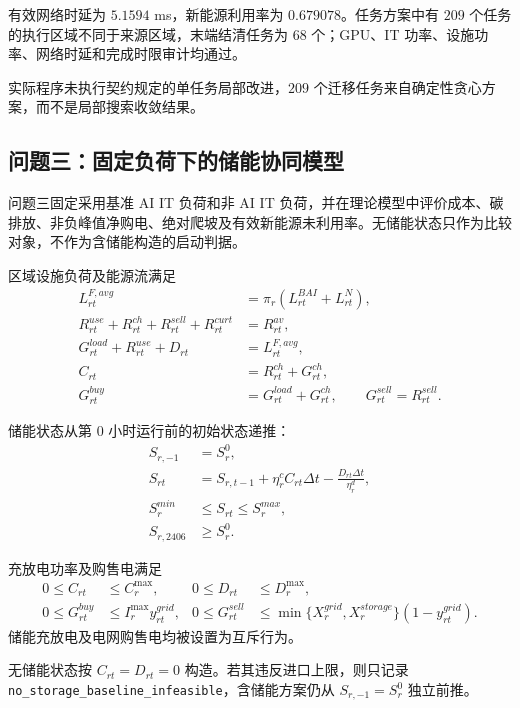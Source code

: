 \documentclass[withoutpreface,bwprint]{cumcmthesis}
\begin{document}
有效网络时延为 $5.1594$ ms，新能源利用率为 $0.679078$。任务方案中有 $209$ 个任务的执行区域不同于来源区域，末端结清任务为 $68$ 个；GPU、IT 功率、设施功率、网络时延和完成时限审计均通过。

实际程序未执行契约规定的单任务局部改进，$209$ 个迁移任务来自确定性贪心方案，而不是局部搜索收敛结果。

\subsection{问题三：固定负荷下的储能协同模型}

问题三固定采用基准 AI IT 负荷和非 AI IT 负荷，并在理论模型中评价成本、碳排放、非负峰值净购电、绝对爬坡及有效新能源未利用率。无储能状态只作为比较对象，不作为含储能构造的启动判据。

区域设施负荷及能源流满足
\begin{align}
L_{rt}^{F,avg}&=\pi_r(L_{rt}^{BAI}+L_{rt}^{N}),\\
R_{rt}^{use}+R_{rt}^{ch}+R_{rt}^{sell}+R_{rt}^{curt}&=R_{rt}^{av},\\
G_{rt}^{load}+R_{rt}^{use}+D_{rt}&=L_{rt}^{F,avg},\\
C_{rt}&=R_{rt}^{ch}+G_{rt}^{ch},\\
G_{rt}^{buy}&=G_{rt}^{load}+G_{rt}^{ch},\qquad
G_{rt}^{sell}=R_{rt}^{sell}.
\end{align}

储能状态从第 $0$ 小时运行前的初始状态递推：
\begin{align}
S_{r,-1}&=S_r^0,\\
S_{rt}&=S_{r,t-1}+\eta_r^cC_{rt}\Delta t
-\frac{D_{rt}\Delta t}{\eta_r^d},\\
S_r^{min}&\le S_{rt}\le S_r^{max},\\
S_{r,2406}&\ge S_r^0.
\end{align}

充放电功率及购售电满足
\begin{align}
0\le C_{rt}&\le C_r^{\max},&
0\le D_{rt}&\le D_r^{\max},\\
0\le G_{rt}^{buy}&\le I_r^{\max}y_{rt}^{grid},&
0\le G_{rt}^{sell}
&\le\min\{X_r^{grid},X_r^{storage}\}(1-y_{rt}^{grid}).
\end{align}
储能充放电及电网购售电均被设置为互斥行为。

无储能状态按 $C_{rt}=D_{rt}=0$ 构造。若其违反进口上限，则只记录 \texttt{no\_storage\_baseline\_infeasible}，含储能方案仍从 $S_{r,-1}=S_r^0$ 独立前推。
\end{document}
